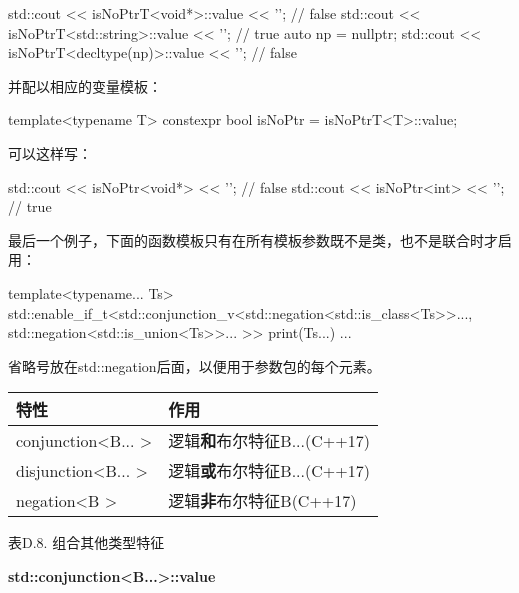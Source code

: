 \begin{cpp}
std::cout << isNoPtrT<void*>::value << '\n'; // false
std::cout << isNoPtrT<std::string>::value << '\n'; // true
auto np = nullptr;
std::cout << isNoPtrT<decltype(np)>::value << '\n'; // false
\end{cpp}

并配以相应的变量模板：

\begin{cpp}
template<typename T>
constexpr bool isNoPtr = isNoPtrT<T>::value;
\end{cpp}

可以这样写：

\begin{cpp}
std::cout << isNoPtr<void*> << '\n'; // false
std::cout << isNoPtr<int> << '\n'; // true
\end{cpp}

最后一个例子，下面的函数模板只有在所有模板参数既不是类，也不是联合时才启用：

\begin{cpp}
template<typename... Ts>
std::enable_if_t<std::conjunction_v<std::negation<std::is_class<Ts>>...,
									std::negation<std::is_union<Ts>>...
									>>
print(Ts...) {
	...
}
\end{cpp}

省略号放在std::negation后面，以便用于参数包的每个元素。

\begin{table}[H]
	\begin{center}
	\begin{tabular}{l|l}
		\hline
		\textbf{特性}                            & \textbf{作用}                                   \\ \hline
		conjunction\textless{}B... \textgreater{} & 逻辑\textbf{和}布尔特征B...(C++17) \\ \hline
		disjunction\textless{}B... \textgreater{} & 逻辑\textbf{或}布尔特征B...(C++17)  \\ \hline
		negation\textless{}B \textgreater{}       & 逻辑\textbf{非}布尔特征B(C++17)     \\ \hline
	\end{tabular}
	\end{center}
\end{table}

\begin{center}
表D.8. 组合其他类型特征
\end{center}

\textbf{std::conjunction<B...>::value}

